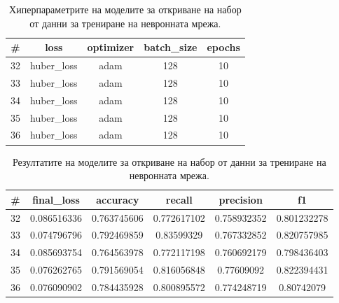 \documentclass{article}
\begin{document}
\begin{table}[H]
\centering
\captionsetup{justification=centering}
\begin{tabular}{|c||c|c|c|c|}
\hline
\# & loss & optimizer & batch\_size & epochs\\
\hline
32 & huber\_loss & adam & 128 & 10\\
33 & huber\_loss & adam & 128 & 10\\
34 & huber\_loss & adam & 128 & 10\\
35 & huber\_loss & adam & 128 & 10\\
36 & huber\_loss & adam & 128 & 10\\
\hline
\end{tabular}
\caption{Хиперпараметрите на моделите за откриване на набор от данни за трениране на невронната мрежа.}
\end{table}

\begin{table}[H]
\centering
\captionsetup{justification=centering}
\begin{tabular}{|c||c|c|c|c|c|}
\hline
\# & final\_loss & accuracy & recall & precision & f1\\
\hline
32 & 0.086516336 & 0.763745606 & 0.772617102 & 0.758932352 & 0.801232278\\
33 & 0.074796796 & 0.792469859 & 0.83599329 & 0.767332852 & 0.820757985\\
34 & 0.085693754 & 0.764563978 & 0.772117198 & 0.760692179 & 0.798436403\\
35 & 0.076262765 & 0.791569054 & 0.816056848 & 0.77609092 & 0.822394431\\
36 & 0.076090902 & 0.784435928 & 0.800895572 & 0.774248719 & 0.80742079\\
\hline
\end{tabular}
\caption{Резултатите на моделите за откриване на набор от данни за трениране на невронната мрежа.}
\end{table}
\end{document}
